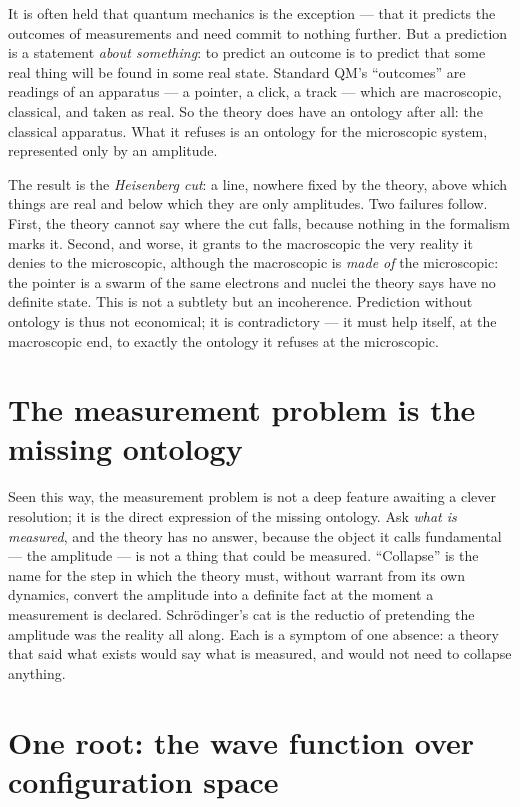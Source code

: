 It is often held that quantum mechanics is the exception --- that it predicts the outcomes of measurements and
need commit to nothing further. But a prediction is a statement \emph{about something}: to predict an outcome is
to predict that some real thing will be found in some real state. Standard QM's ``outcomes'' are readings of an
apparatus --- a pointer, a click, a track --- which are macroscopic, classical, and taken as real. So the theory
does have an ontology after all: the classical apparatus. What it refuses is an ontology for the microscopic
system, represented only by an amplitude.

The result is the \emph{Heisenberg cut}: a line, nowhere fixed by the theory, above which things are real and
below which they are only amplitudes. Two failures follow. First, the theory cannot say where the cut falls,
because nothing in the formalism marks it. Second, and worse, it grants to the macroscopic the very reality it
denies to the microscopic, although the macroscopic is \emph{made of} the microscopic: the pointer is a swarm of
the same electrons and nuclei the theory says have no definite state. This is not a subtlety but an incoherence.
Prediction without ontology is thus not economical; it is contradictory --- it must help itself, at the
macroscopic end, to exactly the ontology it refuses at the microscopic.

\section{The measurement problem is the missing ontology}\label{sec:measurement}

Seen this way, the measurement problem is not a deep feature awaiting a clever resolution; it is the direct
expression of the missing ontology. Ask \emph{what is measured}, and the theory has no answer, because the object
it calls fundamental --- the amplitude --- is not a thing that could be measured. ``Collapse'' is the name for
the step in which the theory must, without warrant from its own dynamics, convert the amplitude into a definite
fact at the moment a measurement is declared. Schr\"odinger's cat is the reductio of pretending the amplitude was
the reality all along. Each is a symptom of one absence: a theory that said what exists would say what is
measured, and would not need to collapse anything.

\section{One root: the wave function over configuration space}\label{sec:config-space}

